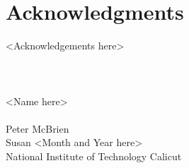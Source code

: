 \cleardoublepage
{}
{}
\chapter*{Acknowledgments}
\vspace{1.0in}
<Acknowledgements here>
\\
\\
\\
\\
<Name here> \\
\\ Peter McBrien
\\ Susan
<Month and Year here>\\
{National Institute of Technology Calicut}\\
\newpage